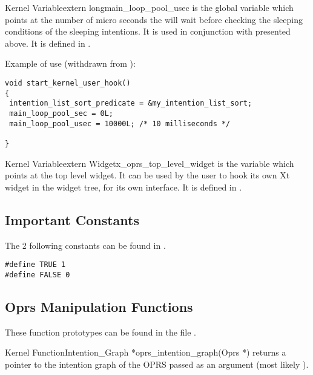 \begin{typevr}{Kernel Variable}{extern long}{main\_loop\_pool\_usec} is the
global variable which points at the number of micro seconds the \CPK{}
will wait
before checking the sleeping conditions of the sleeping intentions. It is
used
in conjunction with  presented above. It is
defined in
.
\end{typevr}

Example of use (withdrawn from ):

\begin{verbatim}
void start_kernel_user_hook()
{
 intention_list_sort_predicate = &my_intention_list_sort;
 main_loop_pool_sec = 0L;
 main_loop_pool_usec = 10000L; /* 10 milliseconds */

}
\end{verbatim}

\begin{typevr}{Kernel Variable}{extern Widget}{x\_oprs\_top\_level\_widget} is the
variable which points at the \XOPRS{} top level widget. It can be used by the
user to hook its own Xt widget in the widget tree, for its own interface.
It is defined in .
\end{typevr}


\subsection{Important Constants}

The 2 following constants can be found in .
\begin{verbatim}
#define TRUE 1
#define FALSE 0
\end{verbatim}

\subsection{Oprs Manipulation Functions}

These function prototypes can be found in the file .

\begin{typefn}{Kernel Function}{Intention\_Graph *}{oprs\_intention\_graph}{(Oprs
*)}
returns a pointer to the intention graph of the OPRS passed as an argument
(most
likely ).
\end{typefn}

